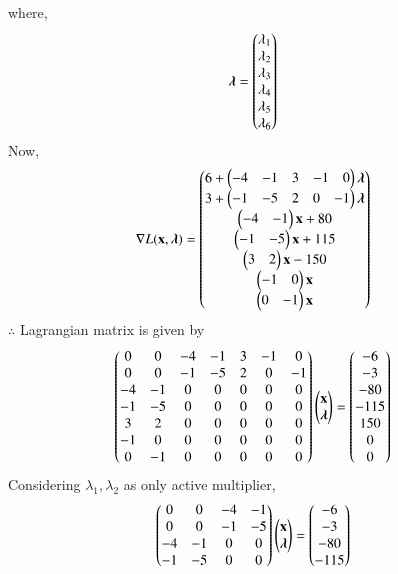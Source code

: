     where,
    \begin{align}
        \boldsymbol{\lambda} &= \begin{pmatrix}\lambda_1 \\ \lambda_2 \\ \lambda_3 \\ \lambda_4 \\ \lambda_5 \\ \lambda_6\end{pmatrix}
    \end{align}
    Now,
    \begin{align}
        \nabla L(\mathbf{x},\boldsymbol{\lambda}) &= \begin{pmatrix}6+ \begin{pmatrix}-4 & -1 & 3 & -1 & 0 \end{pmatrix}\boldsymbol{\lambda}\\ 3+\begin{pmatrix}-1 & -5 & 2 & 0 & -1\end{pmatrix}\boldsymbol{\lambda} \\ \begin{pmatrix}-4 & -1\end{pmatrix}\mathbf{x}+80 \\ \begin{pmatrix}-1 & -5\end{pmatrix}\mathbf{x}+115 \\ \begin{pmatrix}3 & 2\end{pmatrix}\mathbf{x}-150 \\ \begin{pmatrix}-1 & 0\end{pmatrix}\mathbf{x} \\ \begin{pmatrix}0 & -1\end{pmatrix}\mathbf{x}\end{pmatrix}
    \end{align}
    $\therefore$ Lagrangian matrix is given by
    \begin{align}
        \begin{pmatrix}0 & 0 & -4 & -1 & 3 & -1 & 0 \\ 0 & 0 & -1 & -5 & 2 & 0 & -1 \\ -4 & -1 & 0 & 0 & 0 & 0 & 0 \\ -1 & -5 & 0 & 0 & 0 & 0 & 0 \\ 3 & 2 & 0 & 0 & 0 & 0 & 0 \\ -1 & 0 & 0 & 0 & 0 & 0 & 0 \\ 0 & -1 & 0 & 0 & 0 & 0 & 0 \end{pmatrix}\begin{pmatrix}\mathbf{x} \\ \boldsymbol{\lambda} \end{pmatrix} &= \begin{pmatrix}-6 \\ -3 \\ -80 \\ -115 \\ 150 \\ 0 \\0 \end{pmatrix}
    \end{align}
    Considering $\lambda_1,\lambda_2$ as only active multiplier,
    \begin{align}
        \begin{pmatrix}0 & 0 & -4 & -1 \\ 0 & 0 & -1 & -5 \\ -4 & -1 & 0 & 0 \\ -1 & -5 & 0 & 0\end{pmatrix}\begin{pmatrix}\mathbf{x}\\ \boldsymbol{\lambda}\end{pmatrix} &= \begin{pmatrix}-6 \\ -3 \\ -80 \\ -115\end{pmatrix}
    \end{align}
